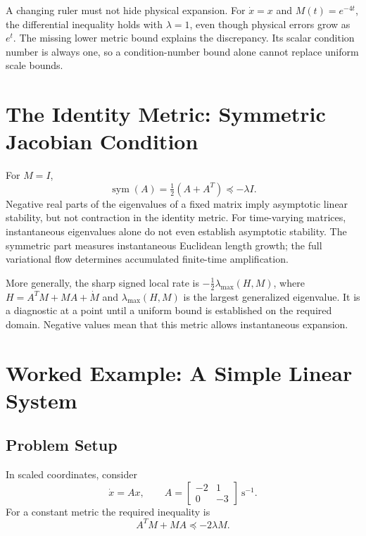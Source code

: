 A changing ruler must not hide physical expansion. For $\dot x=x$ and $M(t)=e^{-4t}$, the differential inequality holds with $\lambda=1$, even though physical errors grow as $e^t$. The missing lower metric bound explains the discrepancy. Its scalar condition number is always one, so a condition-number bound alone cannot replace uniform scale bounds.

\section{The Identity Metric: Symmetric Jacobian Condition}

For $M=I$,
\begin{equation}
\operatorname{sym}(A)=\tfrac12(A+A^T)\preceq-\lambda I.
\label{eq:ch4:symmetric-condition}
\end{equation}
Negative real parts of the eigenvalues of a fixed matrix imply asymptotic linear stability, but not contraction in the identity metric. For time-varying matrices, instantaneous eigenvalues alone do not even establish asymptotic stability. The symmetric part measures instantaneous Euclidean length growth; the full variational flow determines accumulated finite-time amplification.

More generally, the sharp signed local rate is $-\tfrac12\lambda_{\max}(H,M)$, where $H=A^TM+MA+\dot M$ and $\lambda_{\max}(H,M)$ is the largest generalized eigenvalue. It is a diagnostic at a point until a uniform bound is established on the required domain. Negative values mean that this metric allows instantaneous expansion.

\section{Worked Example: A Simple Linear System}
\label{sec:ch4:example}

\subsection{Problem Setup}

In scaled coordinates, consider
\begin{equation}
\dot x=Ax,\qquad A=\begin{bmatrix}-2&1\\0&-3\end{bmatrix}\ \mathrm{s}^{-1}.
\label{eq:ch4:example-system}
\end{equation}
For a constant metric the required inequality is
\begin{equation}
A^TM+MA\preceq-2\lambda M.
\label{eq:ch4:example-LMI}
\end{equation}

